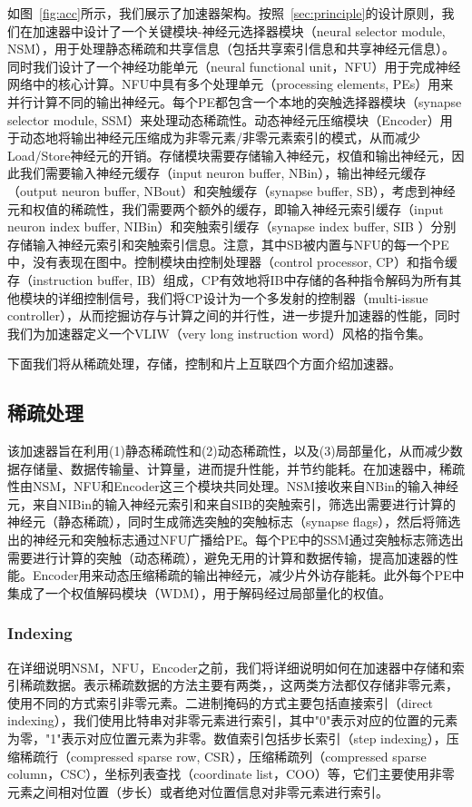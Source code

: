 如图~\ref{fig:acc}所示，我们展示了加速器架构。按照~\ref{sec:principle}的设计原则，我们在加速器中设计了一个关键模块-神经元选择器模块（neural selector module, NSM），用于处理静态稀疏和共享信息（包括共享索引信息和共享神经元信息）。同时我们设计了一个神经功能单元（neural functional unit，NFU）用于完成神经网络中的核心计算。NFU中具有多个处理单元（processing elements, PEs）用来并行计算不同的输出神经元。每个PE都包含一个本地的突触选择器模块（synapse selector module, SSM）来处理动态稀疏性。动态神经元压缩模块（Encoder）用于动态地将输出神经元压缩成为非零元素/非零元素索引的模式，从而减少Load/Store神经元的开销。存储模块需要存储输入神经元，权值和输出神经元，因此我们需要输入神经元缓存（input neuron buffer, NBin），输出神经元缓存（output neuron buffer, NBout）和突触缓存（synapse buffer, SB），考虑到神经元和权值的稀疏性，我们需要两个额外的缓存，即输入神经元索引缓存（input neuron index buffer, NIBin）和突触索引缓存（synapse index buffer, SIB ）分别存储输入神经元索引和突触索引信息。注意，其中SB被内置与NFU的每一个PE中，没有表现在图中。控制模块由控制处理器（control processor, CP）和指令缓存（instruction buffer, IB）组成，CP有效地将IB中存储的各种指令解码为所有其他模块的详细控制信号，我们将CP设计为一个多发射的控制器（multi-issue controller），从而挖掘访存与计算之间的并行性，进一步提升加速器的性能，同时我们为加速器定义一个VLIW（very long instruction word）风格的指令集。

下面我们将从稀疏处理，存储，控制和片上互联四个方面介绍加速器。

\subsection{稀疏处理}
该加速器旨在利用(1)静态稀疏性和(2)动态稀疏性，以及(3)局部量化，从而减少数据存储量、数据传输量、计算量，进而提升性能，并节约能耗。在加速器中，稀疏性由NSM，NFU和Encoder这三个模块共同处理。NSM接收来自NBin的输入神经元，来自NIBin的输入神经元索引和来自SIB的突触索引，筛选出需要进行计算的神经元（静态稀疏），同时生成筛选突触的突触标志（synapse flags），然后将筛选出的神经元和突触标志通过NFU广播给PE。每个PE中的SSM通过突触标志筛选出需要进行计算的突触（动态稀疏），避免无用的计算和数据传输，提高加速器的性能。Encoder用来动态压缩稀疏的输出神经元，减少片外访存能耗。此外每个PE中集成了一个权值解码模块（WDM），用于解码经过局部量化的权值。

\subsubsection{Indexing}
在详细说明NSM，NFU，Encoder之前，我们将详细说明如何在加速器中存储和索引稀疏数据。表示稀疏数据的方法主要有两类，，这两类方法都仅存储非零元素，使用不同的方式索引非零元素。二进制掩码的方式主要包括直接索引（direct indexing），我们使用比特串对非零元素进行索引，其中"0"表示对应的位置的元素为零，"1"表示对应位置元素为非零。数值索引包括步长索引（step indexing），压缩稀疏行（compressed sparse row, CSR），压缩稀疏列（compressed sparse column，CSC），坐标列表查找（coordinate list，COO）等，它们主要使用非零元素之间相对位置（步长）或者绝对位置信息对非零元素进行索引。

